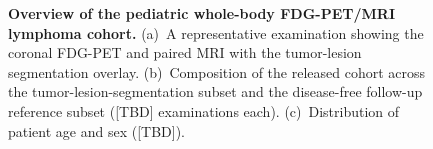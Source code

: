 \begin{figure}[t]
\centering
{}
\caption{\textbf{Overview of the pediatric whole-body FDG-PET/MRI lymphoma cohort.}
(a)~A representative examination showing the coronal FDG-PET and paired MRI with the tumor-lesion segmentation overlay.
(b)~Composition of the released cohort across the tumor-lesion-segmentation subset and the disease-free follow-up reference subset ([TBD] examinations each).
(c)~Distribution of patient age and sex ([TBD]).}
\label{fig:cohort}
\end{figure}
